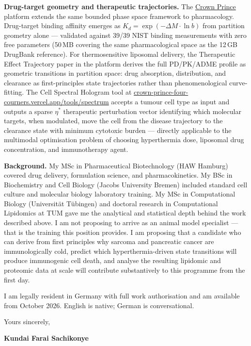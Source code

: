 \documentclass[12pt,a4paper]{article}
\begin{document}
\textbf{Drug-target geometry and therapeutic trajectories.}
The \href{https://crown-prince-four-courners.vercel.app}{Crown Prince} platform
extends the same bounded phase space framework to pharmacology.
Drug-target binding affinity emerges as $K_d = \exp(-\Delta M \cdot \ln b)$
from partition geometry alone --- validated against 39/39 NIST binding measurements
with zero free parameters (50\,MB covering the same pharmacological space as the
12\,GB DrugBank reference). For thermosensitive liposomal delivery, the Therapeutic
Effect Trajectory paper in the platform derives the full PD/PK/ADME profile as
geometric transitions in partition space: drug absorption, distribution, and
clearance as first-principles state trajectories rather than phenomenological
curve-fitting. The Cell Spectral Hologram tool at
\href{https://crown-prince-four-courners.vercel.app/tools/spectrum}{crown-prince-four-courners.vercel.app/tools/spectrum}
accepts a tumour cell type as input and outputs a sparse $\eta^*$ therapeutic
perturbation vector identifying which molecular targets, when modulated, move the
cell from the disease trajectory to the clearance state with minimum cytotoxic
burden --- directly applicable to the multimodal optimisation problem of choosing
hyperthermia dose, liposomal drug concentration, and immunotherapy agent.

\textbf{Background.}
My MSc in Pharmaceutical Biotechnology (HAW Hamburg) covered drug delivery,
formulation science, and pharmacokinetics. My BSc in Biochemistry and Cell
Biology (Jacobs University Bremen) included standard cell culture and molecular
biology laboratory training. My MSc in Computational Biology (Universität
Tübingen) and doctoral research in Computational Lipidomics at TUM gave
me the analytical and statistical depth behind the work described above. I am
not proposing to arrive as an animal model specialist --- that is the training
this position provides. I am proposing that a candidate who can derive from
first principles why sarcoma and pancreatic cancer are immunologically cold,
predict which hyperthermia-driven state transitions will produce immunogenic
cell death, and analyse the resulting lipidomic and proteomic data at scale
will contribute substantively to this programme from the first day.

I am legally resident in Germany with full work authorisation and am available
from October 2026. English is native; German is conversational.

\vspace{1.5em}
Yours sincerely,

\vspace{2.5em}
\textbf{Kundai Farai Sachikonye}
\end{document}
